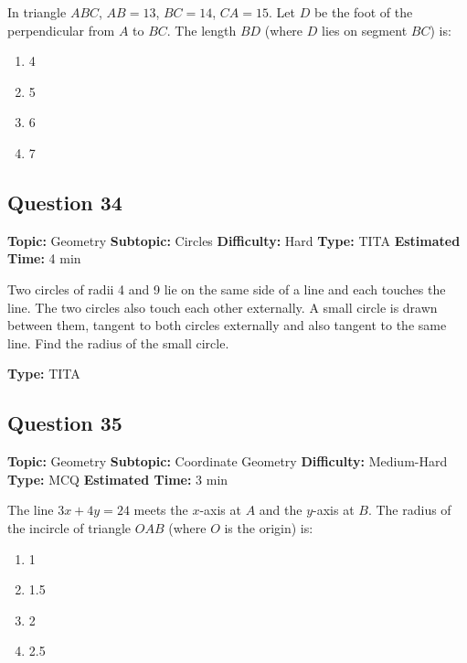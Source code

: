 \documentclass[11pt]{article}
\begin{document}
\begin{tcolorbox}
In triangle $ABC$, $AB = 13$, $BC = 14$, $CA = 15$. Let $D$ be the foot of the perpendicular from $A$ to $BC$. The length $BD$ (where $D$ lies on segment $BC$) is:
\end{tcolorbox}
\begin{enumerate}[label=(\Alph*)]
\item 4
\item 5
\item 6
\item 7
\end{enumerate}

\subsection*{Question 34}
\textbf{Topic:} Geometry \quad \textbf{Subtopic:} Circles \quad \textbf{Difficulty:} Hard \quad \textbf{Type:} TITA \quad \textbf{Estimated Time:} 4 min

\begin{tcolorbox}
Two circles of radii 4 and 9 lie on the same side of a line and each touches the line. The two circles also touch each other externally. A small circle is drawn between them, tangent to both circles externally and also tangent to the same line. Find the radius of the small circle.
\end{tcolorbox}
\textbf{Type:} TITA

\subsection*{Question 35}
\textbf{Topic:} Geometry \quad \textbf{Subtopic:} Coordinate Geometry \quad \textbf{Difficulty:} Medium-Hard \quad \textbf{Type:} MCQ \quad \textbf{Estimated Time:} 3 min

\begin{tcolorbox}
The line $3x + 4y = 24$ meets the $x$-axis at $A$ and the $y$-axis at $B$. The radius of the incircle of triangle $OAB$ (where $O$ is the origin) is:
\end{tcolorbox}
\begin{enumerate}[label=(\Alph*)]
\item 1
\item 1.5
\item 2
\item 2.5
\end{enumerate}

\end{document}

